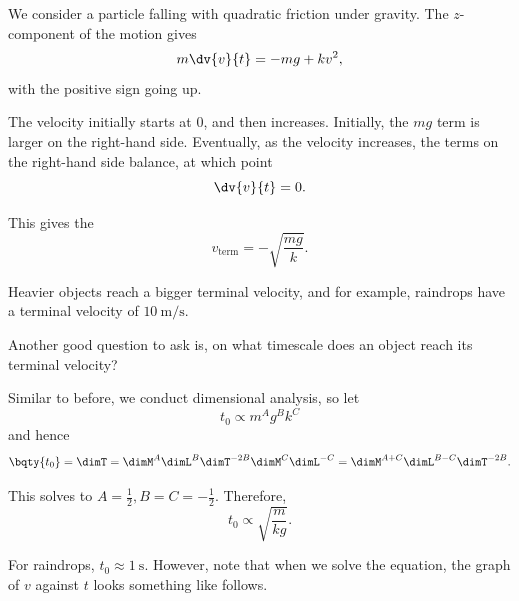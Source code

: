 \begin{example}
    \label{ex:terminal-velocity}%
    We consider a particle falling with quadratic friction under gravity. The \(z\)-component of the motion gives
    \begin{equation}
        m \dv{v}{t} = -mg + k v^2,
    \end{equation}
    with the positive sign going up.

    The velocity initially starts at \(0\), and then increases. Initially, the \(mg\) term is larger on the right-hand side. Eventually, as the velocity increases, the terms on the right-hand side balance, at which point
    \begin{equation}
        \dv{v}{t} = 0.
    \end{equation}

    This gives the 
    \begin{equation}
        \boxed{v_{\text{term}} = - \sqrt{\frac{mg}{k}}.}
    \end{equation}
\end{example}

Heavier objects reach a bigger terminal velocity, and for example, raindrops have a terminal velocity of \(\SI{10}{\metre\per\second}\). 

Another good question to ask is, on what timescale does an object reach its terminal velocity?

\begin{example}
    \label{ex:timescale-reach-terminal-velocity}%
    Similar to before, we conduct dimensional analysis, so let
    \begin{equation}
        t_0 \propto m^A g^B k^C
    \end{equation}
    and hence
    \begin{equation}
        \bqty{t_0} = \dimT = \dimM^A \dimL^B \dimT^{-2B} \dimM^C \dimL^{-C} = \dimM^{A + C} \dimL^{B - C} \dimT^{-2B}.
    \end{equation}

    This solves to \(A = \frac{1}{2}, B = C = - \frac{1}{2}\). Therefore,
    \begin{equation}
        t_0 \propto \sqrt{\frac{m}{kg}}.
    \end{equation}
\end{example}

For raindrops, \(t_0 \approx \SI{1}{\second}\). However, note that when we solve the equation, the graph of \(v\) against \(t\) looks something like follows.

